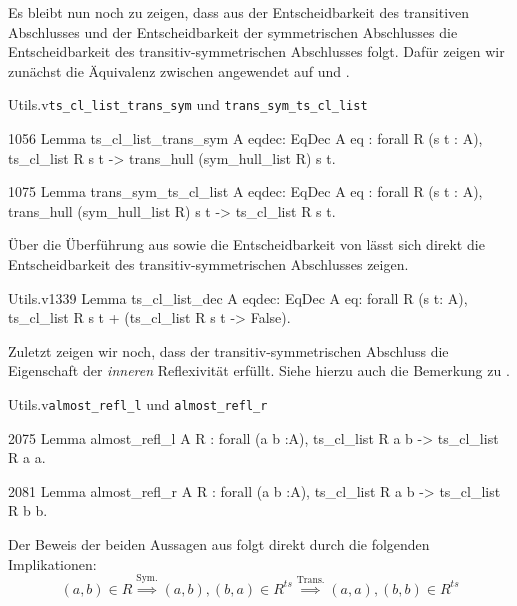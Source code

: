 Es bleibt nun noch zu zeigen, dass aus der Entscheidbarkeit des transitiven Abschlusses und der Entscheidbarkeit der symmetrischen Abschlusses die Entscheidbarkeit des transitiv-symmetrischen Abschlusses folgt. Dafür zeigen wir zunächst die Äquivalenz zwischen  angewendet auf  und .

\begin{multicode}{Utils.v}{}{\texttt{ts\_cl\_list\_trans\_sym} und \texttt{trans\_sym\_ts\_cl\_list}}
\begin{mcode}{1056}
Lemma ts_cl_list_trans_sym {A} {eqdec: EqDec A eq} : 
    forall R (s t : A), ts_cl_list R s t ->
      trans_hull (sym_hull_list R) s t.
\end{mcode}
\begin{mcode}{1075}
Lemma trans_sym_ts_cl_list {A} {eqdec: EqDec A eq} : 
    forall R (s t : A), trans_hull (sym_hull_list R) s t ->
      ts_cl_list R s t.
\end{mcode}
\end{multicode}

Über die Überführung aus  sowie die Entscheidbarkeit von  lässt sich direkt die Entscheidbarkeit des transitiv-symmetrischen Abschlusses zeigen.

\begin{code}{Utils.v}{}{1339}
Lemma ts_cl_list_dec {A} {eqdec: EqDec A eq}: forall R (s t: A), 
    ts_cl_list R s t + (ts_cl_list R s t -> False).
\end{code}

Zuletzt zeigen wir noch, dass der transitiv-symmetrischen Abschluss die Eigenschaft der \emph{inneren} Reflexivität erfüllt. Siehe hierzu auch die Bemerkung zu .

\begin{multicode}{Utils.v}{}{\texttt{almost\_refl\_l} und \texttt{almost\_refl\_r}}
    \begin{mcode}{2075}
Lemma almost_refl_l {A} R : forall (a b :A), ts_cl_list R a b -> 
    ts_cl_list R a a.
    \end{mcode}
    \begin{mcode}{2081}
Lemma almost_refl_r {A} R : forall (a b :A), ts_cl_list R a b -> 
    ts_cl_list R b b.
    \end{mcode}
\end{multicode}
Der Beweis der beiden Aussagen aus  folgt direkt durch die folgenden Implikationen:
\[(a,b)\in R \overset{\text{Sym.}}{\implies} (a,b), (b,a)\in R^{ts} \overset{\text{Trans.}}{\implies} (a,a), (b,b) \in R^{ts}\]

